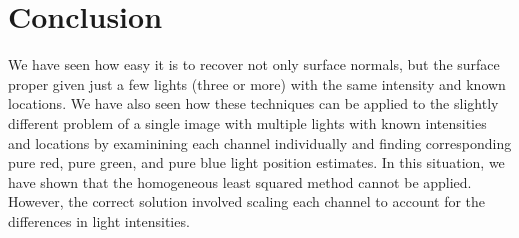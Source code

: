 \documentclass{article}
\begin{document}
\section{Conclusion}

We have seen how easy it is to recover not only surface normals, but the surface 
proper given just a few lights (three or more) with the same intensity and known 
locations. We have also seen how these techniques can be applied to the slightly 
different problem of a single image with multiple lights with known intensities 
and locations by examinining each channel individually and finding 
corresponding pure red, pure green, and pure blue light position estimates. In 
this situation, we have shown that the homogeneous least squared method cannot 
be applied. However, the correct solution involved scaling each channel to 
account for the differences in light intensities.
\end{document}
